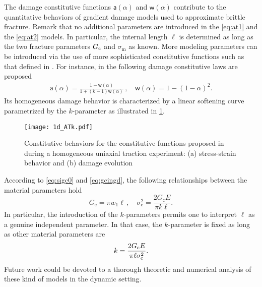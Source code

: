 The damage constitutive functions $\mathsf{a}(\alpha)$ and $\mathsf{w}(\alpha)$ contribute to the quantitative behaviors of gradient damage models used to approximate brittle fracture. Remark that no additional parameters are introduced in the \eqref{eq:at1} and the \eqref{eq:at2} models. In particular, the internal length $\ell$ is determined as long as the two fracture parameters $G_\mathrm{c}$ and $\sigma_\mathrm{m}$ as known. More modeling parameters can be introduced via the use of more sophisticated constitutive functions such as that defined in \cite{LorentzCuvilliezKazymyrenko:2012,AlessiMarigoVidoli:2015}. For instance, in \cite{AlessiMarigoVidoli:2015} the following damage constitutive laws are proposed
\begin{align*}
\mathsf{a}(\alpha)=\frac{1-\mathsf{w}(\alpha)}{1+(k-1)\mathsf{w}(\alpha)}\,,\quad \mathsf{w}(\alpha)=1-(1-\alpha)^2.
\end{align*}
Its homogeneous damage behavior is characterized by a linear softening curve parametrized by the $k$-parameter as illustrated in \cref{fig:atk}.
\begin{figure}[htbp]
\centering
\texttt{[image: 1d\_ATk.pdf]}
\caption{Constitutive behaviors for the constitutive functions proposed in \cite{AlessiMarigoVidoli:2015} during a homogeneous uniaxial traction experiment: (a) stress-strain behavior and (b) damage evolution} \label{fig:atk}
\end{figure}
According to \eqref{eq:sigc0} and \eqref{eq:gcingd}, the following relationships between the material parameters hold
\[
G_\mathrm{c}=\pi w_1\ell\,,\quad \sigma_\mathrm{c}^2=\frac{2G_\mathrm{c}E}{\pi k\ell}.
\]
In particular, the introduction of the $k$-parameters permits one to interpret $\ell$ as a genuine independent parameter. In that case, the $k$-parameter is fixed as long as other material parameters are
\[
k=\frac{2G_\mathrm{c} E}{\pi\ell\sigma_\mathrm{c}^2}.
\]
Future work could be devoted to a thorough theoretic and numerical analysis of these kind of models in the dynamic setting.

